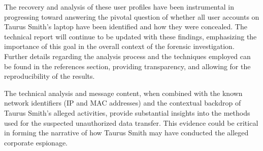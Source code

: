 The recovery and analysis of these user profiles have been instrumental in progressing toward answering the pivotal question of whether all user accounts on Taurus Smith's laptop have been identified and how they were concealed. The technical report will continue to be updated with these findings, emphasizing the importance of this goal in the overall context of the forensic investigation. Further details regarding the analysis process and the techniques employed can be found in the references section, providing transparency, and allowing for the reproducibility of the results.


The technical analysis and message content, when combined with the known network identifiers (IP and MAC addresses) and the contextual backdrop of Taurus Smith's alleged activities, provide substantial insights into the methods used for the suspected unauthorized data transfer. This evidence could be critical in forming the narrative of how Taurus Smith may have conducted the alleged corporate espionage.